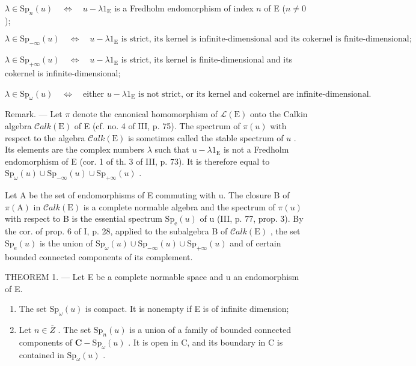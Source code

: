 \(\lambda \in \mathrm{Sp}_n(u) \quad \Longleftrightarrow \quad u - \lambda 1_{\mathrm{E}}\) is a Fredholm endomorphism of index \(n\) of E (\(n \neq 0\));

\[
\lambda \in \mathrm{Sp} _ {- \infty} (u) \quad \Longleftrightarrow \quad u - \lambda 1 _ {\mathrm{E}} \text{ is strict, its kernel is infinite-dimensional and its cokernel is finite-dimensional;}
\]

\(\lambda \in \mathrm{Sp}_{+\infty}(u) \quad \Longleftrightarrow \quad u - \lambda 1_{\mathrm{E}}\) is strict, its kernel is finite-dimensional and its cokernel is infinite-dimensional;

\(\lambda \in \mathrm{Sp}_{\omega}(u) \quad \Longleftrightarrow \quad \text{either } u - \lambda 1_{\mathrm{E}} \text{ is not strict, or its kernel and cokernel are infinite-dimensional.}\)

Remark. --- Let \(\pi\) denote the canonical homomorphism of \(\mathcal{L}(\mathrm{E})\) onto the Calkin algebra \(\mathcal{C}alk(\mathrm{E})\) of E (cf. no. 4 of III, p. 75). The spectrum of \(\pi(u)\) with respect to the algebra \(\mathcal{C}alk(\mathrm{E})\) is sometimes called the stable spectrum of \(u\) . Its elements are the complex numbers \(\lambda\) such that \(u - \lambda 1_{\mathrm{E}}\) is not a Fredholm endomorphism of E (cor. 1 of th. 3 of III, p. 73). It is therefore equal to \(\mathrm{Sp}_{\omega}(u) \cup \mathrm{Sp}_{-\infty}(u) \cup \mathrm{Sp}_{+\infty}(u)\) .

Let A be the set of endomorphisms of E commuting with u. The closure B of \(\pi(\mathrm{A})\) in \(\mathcal{C}alk(\mathrm{E})\) is a complete normable algebra and the spectrum of \(\pi(u)\) with respect to B is the essential spectrum \(\mathrm{Sp}_{\mathrm{e}}(u)\) of u (III, p. 77, prop. 3). By the cor. of prop. 6 of I, p. 28, applied to the subalgebra B of \(\mathcal{C}alk(\mathrm{E})\) , the set \(\mathrm{Sp}_{\mathrm{e}}(u)\) is the union of \(\mathrm{Sp}_{\omega}(u) \cup \mathrm{Sp}_{-\infty}(u) \cup \mathrm{Sp}_{+\infty}(u)\) and of certain bounded connected components of its complement.

THEOREM 1. --- Let E be a complete normable space and u an endomorphism of E.

\begin{enumerate}
\def\labelenumi{\alph{enumi})}
\item
  The set \(\mathrm{Sp}_{\omega}(u)\) is compact. It is nonempty if E is of infinite dimension;
\item
  Let \(n \in \overline{Z}\) . The set \(\mathrm{Sp}_{n}(u)\) is a union of a family of bounded connected components of \(\mathbf{C} - \mathrm{Sp}_{\omega}(u)\) . It is open in C, and its boundary in C is contained in \(\mathrm{Sp}_{\omega}(u)\) .
\end{enumerate}

